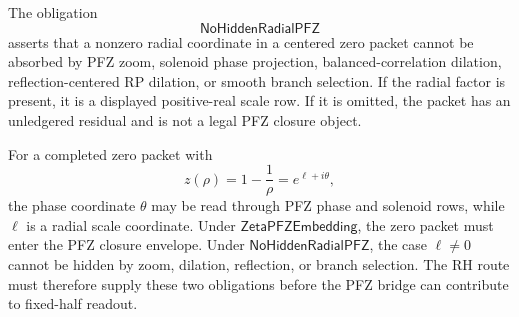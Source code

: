 \begin{definition}[NoHiddenRadialPFZ]
\label{def:rh-no-hidden-radial-pfz}
The obligation
$$
\mathsf{NoHiddenRadialPFZ}
$$
asserts that a nonzero radial coordinate in a centered zero packet cannot
be absorbed by PFZ zoom, solenoid phase projection, balanced-correlation
dilation, reflection-centered RP dilation, or smooth branch selection.
If the radial factor is present, it is a displayed positive-real scale
row.  If it is omitted, the packet has an unledgered residual and is not
a legal PFZ closure object.
\end{definition}

\begin{principle}
\label{prin:rh-pfz-obstruction-bridge-rh-role}
For a completed zero packet with
$$
z(\rho)=1-\frac1\rho=e^{\ell+i\theta},
$$
the phase coordinate $\theta$ may be read through PFZ phase and solenoid
rows, while $\ell$ is a radial scale coordinate.  Under
$\mathsf{ZetaPFZEmbedding}$, the zero packet must enter the PFZ closure
envelope.  Under $\mathsf{NoHiddenRadialPFZ}$, the case $\ell\ne0$ cannot
be hidden by zoom, dilation, reflection, or branch selection.  The RH
route must therefore supply these two obligations before the PFZ bridge
can contribute to fixed-half readout.
\end{principle}
